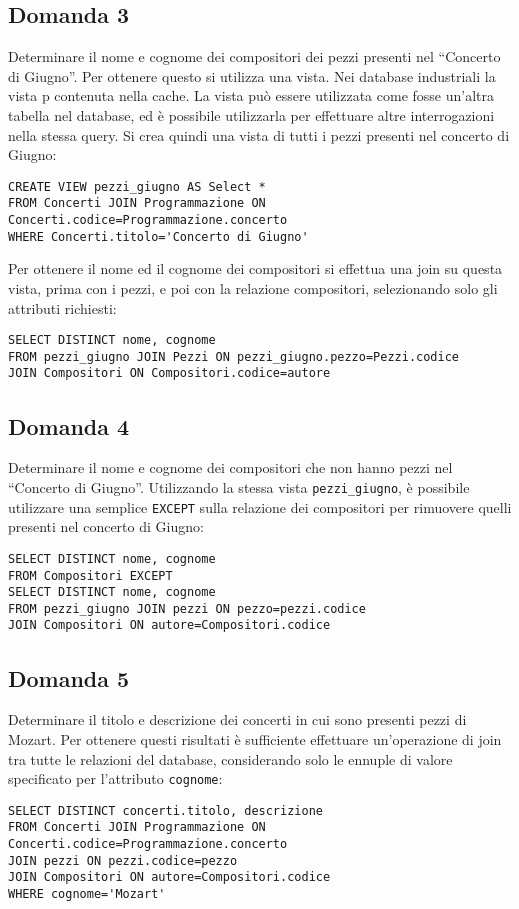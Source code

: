 \documentclass{article}
\numberwithin{equation}{subsection}
\begin{document}
\subsection*{Domanda 3}
Determinare il nome e cognome dei compositori dei pezzi presenti nel ``Concerto di Giugno''. Per ottenere questo si utilizza una vista. Nei database industriali 
la vista p contenuta nella cache. La vista può essere utilizzata come fosse un'altra tabella nel database, ed è possibile utilizzarla per effettuare altre 
interrogazioni nella stessa query. Si crea quindi una vista di tutti i pezzi presenti nel concerto di Giugno:
\begin{verbatim}
CREATE VIEW pezzi_giugno AS Select *
FROM Concerti JOIN Programmazione ON Concerti.codice=Programmazione.concerto
WHERE Concerti.titolo='Concerto di Giugno'
\end{verbatim}
Per ottenere il nome ed il cognome dei compositori si effettua una join su questa vista, prima con i pezzi, e poi con la relazione compositori, selezionando solo gli 
attributi richiesti:
\begin{verbatim}
SELECT DISTINCT nome, cognome
FROM pezzi_giugno JOIN Pezzi ON pezzi_giugno.pezzo=Pezzi.codice
JOIN Compositori ON Compositori.codice=autore
\end{verbatim}

\subsection*{Domanda 4}
Determinare il nome e cognome dei compositori che non hanno pezzi nel ``Concerto di Giugno''. Utilizzando la stessa vista \verb|pezzi_giugno|, è possibile utilizzare una semplice \verb|EXCEPT| sulla 
relazione dei compositori per rimuovere quelli presenti nel concerto di Giugno:
\begin{verbatim}
SELECT DISTINCT nome, cognome
FROM Compositori EXCEPT
SELECT DISTINCT nome, cognome
FROM pezzi_giugno JOIN pezzi ON pezzo=pezzi.codice 
JOIN Compositori ON autore=Compositori.codice
\end{verbatim}

\subsection*{Domanda 5}
Determinare il titolo e descrizione dei concerti in cui sono presenti pezzi di Mozart. Per ottenere questi risultati è sufficiente effettuare un'operazione di join tra tutte le relazioni del database, 
considerando solo le ennuple di valore specificato per l'attributo \verb|cognome|:
\begin{verbatim}
SELECT DISTINCT concerti.titolo, descrizione 
FROM Concerti JOIN Programmazione ON Concerti.codice=Programmazione.concerto
JOIN pezzi ON pezzi.codice=pezzo
JOIN Compositori ON autore=Compositori.codice
WHERE cognome='Mozart'
\end{verbatim}
\end{document}
